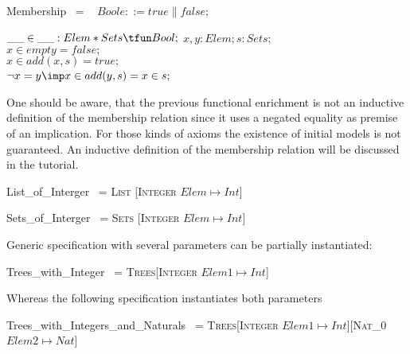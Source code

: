 \documentclass[landscape, autoslides, light]{mmiss}
\begin{document}
\begin{Package}[Label={FSDPT}, Title={Formal Specification of Data and Process Types}, ShortTitle={FSDPT}, Authors={Horst Reichel}, Date={February 2003}, LevelOfDetail=Lecture, Language=en-GB]
\begin{Section}[Title={Initial Algebras as Data Types}, Label={section3}]
\begin{Section}[Title={Generic Specifications}, Label={section3_4}]
\begin{Paragraph}[Title={functional ennrichment of sets}, Label=Paragraph67]
 \begin{SpecDefn}{Membership} ~= 
 \I\Then
 \I{\Free~\Type}~
  \( Boole ::= true \| false; \)
\I\Then \item[\Group] \begin{Items} \I\Ops \( \_\_ \in \_\_ : Elem
* Sets \tfun Bool; \) \I\Vars \( x, y : Elem; s : Sets ;\)
\I\Axioms~
\\ \( x \in empty = false ; \)
\\ \( x \in add(x,s) = true ; \)
\\ \( \neg x = y  \imp x \in add(y,s) = x \in s ;\)
~\EndGroup \end{Items}
\end{SpecDefn}


\end{Paragraph}
 \begin{Paragraph}[Title={functional ennrichment of sets}, Label=Paragraph68]

 One should be aware, that the previous functional enrichment is
 not an inductive definition of the membership relation since it
 uses a negated equality as premise of an implication. For those
 kinds of axioms the existence of initial models is not
 guaranteed. An inductive definition of the membership relation
 will be discussed in the tutorial.



\end{Paragraph}
\begin{Paragraph}[Title={Parameter instantiation}, Label=Paragraph69]

\begin{SpecDefn} {List\_of\_Interger} ~= \textsc{List} [\textsc{Integer}
 \Fit \( Elem \mapsto Int \)] \End \end{SpecDefn}

\begin{SpecDefn} {Sets\_of\_Interger} ~= \textsc{Sets} [\textsc{Integer}
 \Fit \( Elem \mapsto Int \)] \End \end{SpecDefn}

Generic specification with several parameters can be partially
instantiated:
\begin{SpecDefn}{Trees\_with\_Integer} ~=
\textsc{Trees}[\textsc{Integer} \Fit \(Elem1 \mapsto Int\)] \End
\end{SpecDefn}

Whereas the following specification instantiates both parameters
\begin{SpecDefn}{Trees\_with\_Integers\_and\_Naturals} ~=
\textsc{Trees}[\textsc{Integer} \Fit \(Elem1 \mapsto
Int\)][\textsc{Nat\_0} \Fit \(Elem2 \mapsto Nat\)] \End
\end{SpecDefn}


\end{Paragraph}
\end{Section}
\end{Section}
\end{Package}
\end{document}
